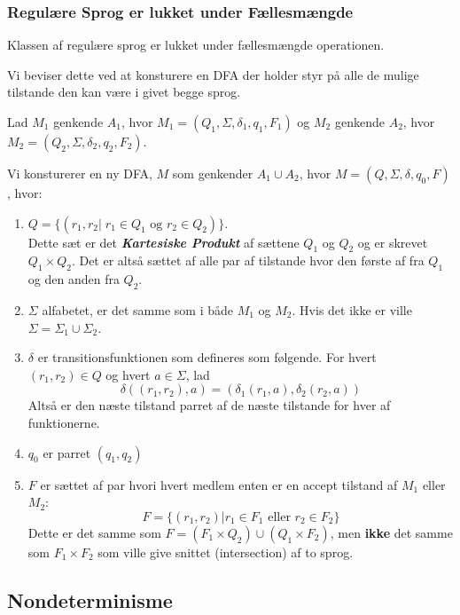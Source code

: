 \begin{frame}[allowframebreaks]
	\frametitle{Regulære Sprog er lukket under Fællesmængde}
	\begin{theorem}
		Klassen af regulære sprog er lukket under fællesmængde operationen.
	\end{theorem}

	Vi beviser dette ved at konsturere en DFA der holder styr på alle de mulige tilstande den kan være i givet begge sprog.

	Lad $M_{1}$ genkende $A_{1}$, hvor $M_{1} = (Q_{1}, \Sigma, \delta_{1}, q_{1}, F_{1})$ og $M_{2}$ genkende $A_{2}$, hvor $M_{2} = (Q_{2}, \Sigma, \delta_{2}, q_{2}, F_{2})$.

	Vi konsturerer en ny DFA, $M$ som genkender $A_{1} \cup A_{2}$, hvor $M = (Q, \Sigma, \delta, q_{0}, F)$, hvor:
	\begin{enumerate}
		\item $Q = \{(r_{1}, r_{2}| \; r_{1} \in Q_{1} \text{ og } r_{2} \in Q_{2})\}$. \\
		      Dette sæt er det \textit{\textbf{Kartesiske Produkt}} af sættene $Q_{1}$ og $Q_{2}$ og er skrevet $Q_{1} \times Q_2$. Det er altså sættet af alle par af tilstande hvor den første af fra $Q_{1}$ og den anden fra $Q_{2}$.
		\item $\Sigma$ alfabetet, er det samme som i både $M_1$ og $M_{2}$. Hvis det ikke er ville $\Sigma = \Sigma_{1} \cup \Sigma_{2}$.
		\item $\delta$ er transitionsfunktionen som defineres som følgende. For hvert $(r_{1}, r_{2}) \in Q$ og hvert $a \in \Sigma$, lad
		      \[\delta \left( (r_{1}, r_{2}), a \right) = \left(\delta_{1} (r_{1}, a), \delta_{2}(r_{2}, a) \right)\] Altså er den næste tilstand parret af de næste tilstande for hver af funktionerne.
		\item $q_{0}$ er parret $(q_{1}, q_{2})$
		\item $F$ er sættet af par hvori hvert medlem enten er en accept tilstand af $M_1$ eller $M_{2}$: \[ F = \{(r_{1}, r_{2})| r_{1} \in F_{1} \text{ eller } r_{2} \in F_{2}\} \]
		      Dette er det samme som $F = (F_{1} \times Q_{2}) \cup (Q_{1} \times F_{2})$, men \textbf{ikke} det samme som $F_{1} \times F_{2}$ som ville give snittet (intersection) af to sprog.
	\end{enumerate}
\end{frame}

\subsection{Nondeterminisme}%
\label{subsec:nondeterminisme}

